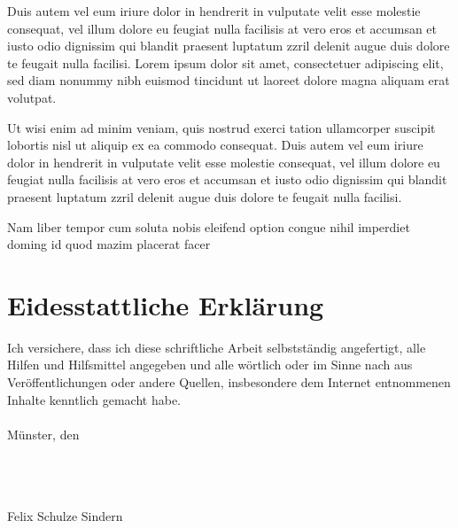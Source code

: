 \documentclass[12pt]{report}
\begin{document}
Duis autem vel eum iriure dolor in hendrerit in vulputate velit esse molestie consequat, vel illum dolore eu feugiat nulla facilisis at vero eros et accumsan et iusto odio dignissim qui blandit praesent luptatum zzril delenit augue duis dolore te feugait nulla facilisi. Lorem ipsum dolor sit amet, consectetuer adipiscing elit, sed diam nonummy nibh euismod tincidunt ut laoreet dolore magna aliquam erat volutpat.   

Ut wisi enim ad minim veniam, quis nostrud exerci tation ullamcorper suscipit lobortis nisl ut aliquip ex ea commodo consequat. Duis autem vel eum iriure dolor in hendrerit in vulputate velit esse molestie consequat, vel illum dolore eu feugiat nulla facilisis at vero eros et accumsan et iusto odio dignissim qui blandit praesent luptatum zzril delenit augue duis dolore te feugait nulla facilisi.   

Nam liber tempor cum soluta nobis eleifend option congue nihil imperdiet doming id quod mazim placerat facer

\chapter*{Eidesstattliche Erklärung}
Ich versichere, dass ich diese schriftliche Arbeit selbstständig angefertigt, alle Hilfen und Hilfsmittel angegeben und alle wörtlich oder im Sinne nach aus Veröffentlichungen oder andere Quellen, insbesondere dem Internet entnommenen Inhalte kenntlich gemacht habe.\\\\
Münster, den \date{\today}\\\\
\makebox[7cm]{\hrulefill}\\
Felix Schulze Sindern
\end{document}
